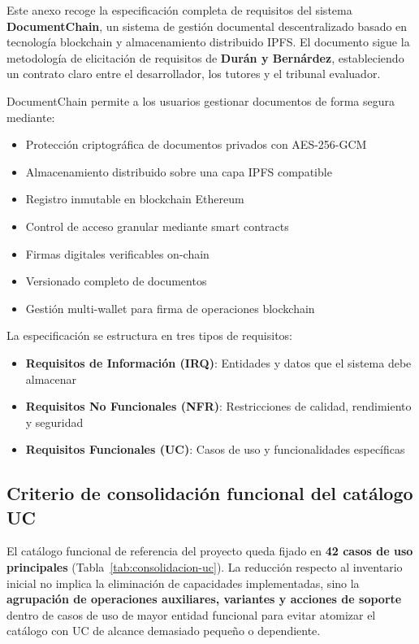 \documentclass[11pt, a4paper]{article}
\begin{document}
Este anexo recoge la especificación completa de requisitos del sistema \textbf{DocumentChain}, un sistema de gestión documental descentralizado basado en tecnología blockchain y almacenamiento distribuido IPFS. El documento sigue la metodología de elicitación de requisitos de \textbf{Durán y Bernárdez}, estableciendo un contrato claro entre el desarrollador, los tutores y el tribunal evaluador.

DocumentChain permite a los usuarios gestionar documentos de forma segura mediante:
\begin{itemize}
    \item Protección criptográfica de documentos privados con AES-256-GCM
    \item Almacenamiento distribuido sobre una capa IPFS compatible
    \item Registro inmutable en blockchain Ethereum
    \item Control de acceso granular mediante smart contracts
    \item Firmas digitales verificables on-chain
    \item Versionado completo de documentos
    \item Gestión multi-wallet para firma de operaciones blockchain
\end{itemize}

La especificación se estructura en tres tipos de requisitos:
\begin{itemize}
    \item \textbf{Requisitos de Información (IRQ)}: Entidades y datos que el sistema debe almacenar
    \item \textbf{Requisitos No Funcionales (NFR)}: Restricciones de calidad, rendimiento y seguridad
    \item \textbf{Requisitos Funcionales (UC)}: Casos de uso y funcionalidades específicas
\end{itemize}

\subsection*{Criterio de consolidación funcional del catálogo UC}

El catálogo funcional de referencia del proyecto queda fijado en \textbf{42 casos de uso principales} (Tabla~\ref{tab:consolidacion-uc}). La reducción respecto al inventario inicial no implica la eliminación de capacidades implementadas, sino la \textbf{agrupación de operaciones auxiliares, variantes y acciones de soporte} dentro de casos de uso de mayor entidad funcional para evitar atomizar el catálogo con UC de alcance demasiado pequeño o dependiente.
\end{document}
